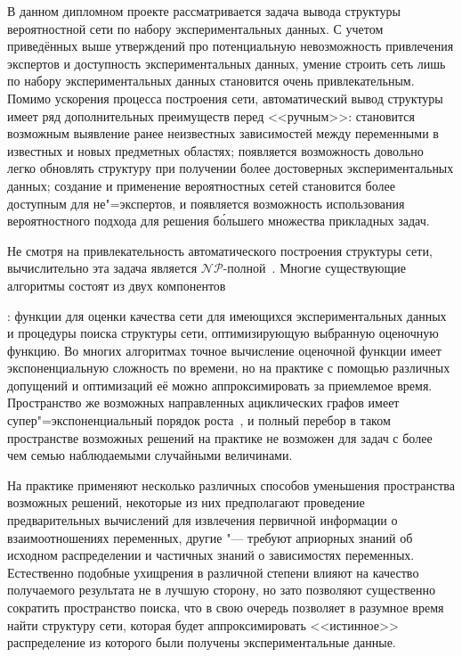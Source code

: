 В данном дипломном проекте рассматривается задача вывода структуры вероятностной сети по набору экспериментальных данных.
С учетом приведённых выше утверждений про потенциальную невозможность привлечения экспертов и доступность экспериментальных данных, умение строить сеть лишь по набору экспериментальных данных становится очень привлекательным.
Помимо ускорения процесса построения сети, автоматический вывод структуры имеет ряд дополнительных преимуществ перед <<ручным>>: становится возможным выявление ранее неизвестных зависимостей между переменными в известных и новых предметных областях; появляется возможность довольно легко обновлять структуру при получении более достоверных экспериментальных данных; создание и применение вероятностных сетей становится более доступным для не"=экспертов, и появляется возможность использования вероятностного подхода для решения б\'{о}льшего множества прикладных задач.

Не смотря на привлекательность автоматического построения структуры сети, вычислительно эта задача является $\mathcal{NP}$-полной~\cite{Chickering96learningbayesian}.
Многие существующие алгоритмы состоят из двух компонентов: функции для оценки качества сети для имеющихся экспериментальных данных и процедуры поиска структуры сети, оптимизирующую выбранную оценочную функцию.
Во многих алгоритмах точное вычисление оценочной функции имеет экспоненциальную сложность по времени, но на практике с помощью различных допущений и оптимизаций её можно аппроксимировать за приемлемое время.
Пространство же возможных направленных ациклических графов имеет супер"=экспоненциальный порядок роста~\cite{robinson_1977}, и полный перебор в таком пространстве возможных решений на практике не возможен для задач с более чем семью наблюдаемыми случайными величинами.

На практике применяют несколько различных способов уменьшения пространства возможных решений, некоторые из них предполагают проведение предварительных вычислений для извлечения первичной информации о взаимоотношениях переменных, другие "--- требуют априорных знаний об исходном распределении и частичных знаний о зависимостях переменных.
Естественно подобные ухищрения в различной степени влияют на качество получаемого результата не в лучшую сторону, но зато позволяют существенно сократить пространство поиска, что в свою очередь позволяет в разумное время найти структуру сети, которая будет аппроксимировать <<истинное>> распределение из которого были получены экспериментальные данные.

